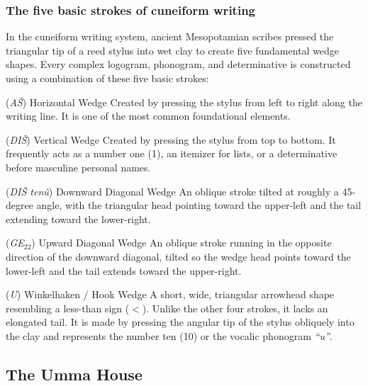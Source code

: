 \documentclass[11pt, a4paper]{article}
\begin{document}
\subsubsection*{The five basic strokes of cuneiform writing}

In the cuneiform writing system, ancient Mesopotamian scribes pressed the triangular tip of a reed stylus into wet clay to create five fundamental wedge shapes. Every complex logogram, phonogram, and determinative is constructed using a combination of these five basic strokes:

\begin{description}
	\item \textrm{(\textit{A\v{S}}) Horizontal Wedge } \raisebox{0.6ex}{\cuniHorizontal}\; Created by pressing the stylus from left to right along the writing line. It is one of the most common foundational elements.

	\item \textrm{(\textit{DI\v{S}}) Vertical Wedge } \raisebox{1.6ex}{\cuniVertical}\; Created by pressing the stylus from top to bottom. It frequently acts as a number one (\textrm{1}), an itemizer for lists, or a determinative before masculine personal names.

	\item \textrm{(\textit{DI\v{S} ten\^{u}}) Downward Diagonal Wedge  \raisebox{0.6ex}{\cuniDiagDown}\; } An oblique stroke tilted at roughly a 45-degree angle, with the triangular head pointing toward the upper-left and the tail extending toward the lower-right.

	\item \textrm{(\textit{GE$_{22}$}) Upward Diagonal Wedge } \raisebox{0.6ex}{\cuniDiagUp}\;  An oblique stroke running in the opposite direction of the downward diagonal, tilted so the wedge head points toward the lower-left and the tail extends toward the upper-right.

	\item \textrm{(\textit{U}) Winkelhaken / Hook Wedge } \raisebox{0.6ex}{\cuniWinkel}\;  A short, wide, triangular arrowhead shape resembling a less-than sign ($<$). Unlike the other four strokes, it lacks an elongated tail. It is made by pressing the angular tip of the stylus obliquely into the clay and represents the number ten (\textrm{10}) or the vocalic phonogram \textit{``u''}.
\end{description}



\subsection{The Umma House}
\end{document}
